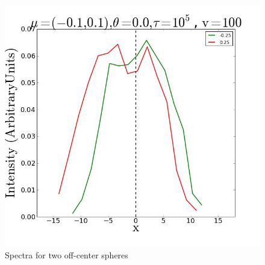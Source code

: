 \documentclass[usenatbib]{mn2e}
\begin{document}
\begin{figure}
\includegraphics[scale=0.3]{OC_5t_vel100.jpg}
\caption{Spectra for two off-center spheres
   \label{fig:OCspectra}} 
\end{figure}



 
\end{document}
